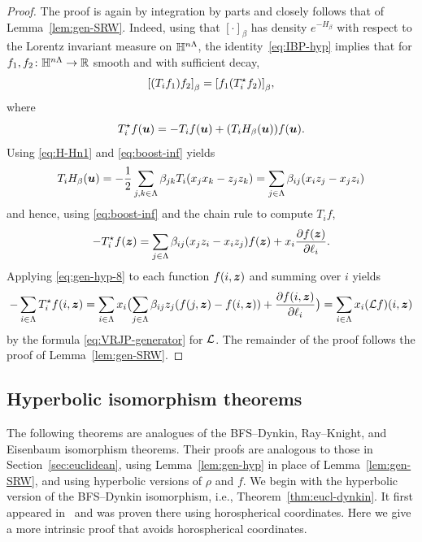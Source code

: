 \documentclass[11pt,a4paper]{article}
\begin{document}
\begin{proof}
  The proof is again by integration by parts and closely follows that of
  Lemma~\ref{lem:gen-SRW}.
  Indeed, using that $[\cdot]_\beta$ has density $e^{-H_\beta}$ with respect to the Lorentz invariant measure on $\mathbb{H}^{n\Lambda}$,
  the identity~\eqref{eq:IBP-hyp} implies that
  for $f_{1},f_{2}\colon \mathbb{H}^{n\Lambda}\to \mathbb{R}$ smooth and with sufficient decay,
  \begin{equation}
    \label{eq:gen-hyp-4}
    \cb{(T_{i}f_{1})f_{2}}_{\beta} = \cb{f_{1}(T^{\star}_{i}f_{2})}_{\beta},
  \end{equation}
  where
  \begin{equation}
    \label{eq:gen-hyp-5}
    T^{\star}_{i}f(\boldsymbol{u}) = -T_{i}f(\boldsymbol{u}) + (T_{i}H_{\beta}(\boldsymbol{u})) f(\boldsymbol{u}).
  \end{equation}
  Using \eqref{eq:H-Hn1} and \eqref{eq:boost-inf} yields
  \begin{equation}
    \label{eq:gen-hyp-6}
    T_{i}H_{\beta}(\boldsymbol{u}) 
    = -\frac{1}{2}\sum_{j,k\in\Lambda}\beta_{jk} T_{i}( x_{j}x_{k} - z_{j}z_{k}) 
    = \sum_{j\in\Lambda}\beta_{ij}(x_{i}z_{j} - x_{j}z_{i})
  \end{equation}
  and hence, using \eqref{eq:boost-inf} and the chain rule to compute
  $T_{i}f$,
  \begin{equation}
    \label{eq:gen-hyp-8}
    -T_{i}^{\star}f(\boldsymbol{z})  =
    \sum_{j\in\Lambda}\beta_{ij}(x_{j}z_{i}-x_{i}z_{j})f(\boldsymbol{z}) + x_{i}\frac{\partial f(\boldsymbol{z})}{\partial \ell_{i}}.
  \end{equation}
  Applying \eqref{eq:gen-hyp-8} to each function $f(i,\boldsymbol{z})$ and
  summing over $i$ yields
  \begin{equation}
    \label{eq:gen-hyp-9}
    -\sum_{i\in\Lambda}T_{i}^{\star}f(i,\boldsymbol{z}) 
    =
    \sum_{i\in\Lambda}x_{i}\bigl({\sum_{j\in\Lambda}\beta_{ij}z_{j}(
      f(j,\boldsymbol{z})-f(i,\boldsymbol{z})) + \frac{\partial f(i,\boldsymbol{z})}{\partial \ell_{i}}}\bigr) 
      = \sum_{i\in\Lambda}x_{i}(\mathcal L f)(i,\boldsymbol{z})
  \end{equation}
  by the formula \eqref{eq:VRJP-generator} for $\mathcal L$. The remainder of
  the proof follows the proof of Lemma~\ref{lem:gen-SRW}.
\end{proof}


\subsection{Hyperbolic isomorphism theorems}

The following theorems are analogues of the BFS--Dynkin, Ray--Knight,
and Eisenbaum isomorphism theorems.  Their proofs are analogous to
those in Section~\ref{sec:euclidean}, using Lemma~\ref{lem:gen-hyp} in
place of Lemma~\ref{lem:gen-SRW}, and using hyperbolic versions of
$\rho$ and $f$.  We begin with the hyperbolic version of the
BFS--Dynkin isomorphism, i.e., Theorem~\ref{thm:eucl-dynkin}. It first
appeared in~\cite{1802.02077} and was proven there using horospherical
coordinates.  Here we give a more intrinsic proof that avoids
horospherical coordinates.
\end{document}
